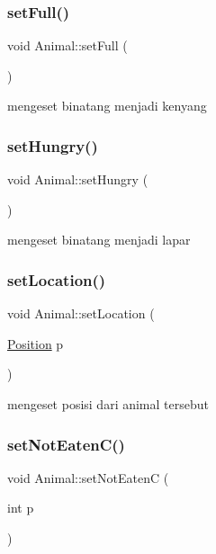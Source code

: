 \subsubsection{\texorpdfstring{setFull()}{setFull()}}
{\footnotesize\ttfamily void Animal\+::set\+Full (\begin{DoxyParamCaption}{ }\end{DoxyParamCaption})}

mengeset binatang menjadi kenyang \mbox{\label{class_animal_abc2b03fe8afdb2a9339c2f139d97ca62}} 
\subsubsection{\texorpdfstring{setHungry()}{setHungry()}}
{\footnotesize\ttfamily void Animal\+::set\+Hungry (\begin{DoxyParamCaption}{ }\end{DoxyParamCaption})}

mengeset binatang menjadi lapar \mbox{\label{class_animal_ac61827dde571ed242d1e9010ed0e6eab}} 
\subsubsection{\texorpdfstring{setLocation()}{setLocation()}}
{\footnotesize\ttfamily void Animal\+::set\+Location (\begin{DoxyParamCaption}\item[{\mbox{\hyperlink{class_position}{Position}}}]{p }\end{DoxyParamCaption})}

mengeset posisi dari animal tersebut \mbox{\label{class_animal_a0bc097a6f9546779fcfc57f22a930a94}} 
\subsubsection{\texorpdfstring{setNotEatenC()}{setNotEatenC()}}
{\footnotesize\ttfamily void Animal\+::set\+Not\+EatenC (\begin{DoxyParamCaption}\item[{int}]{p }\end{DoxyParamCaption})}

